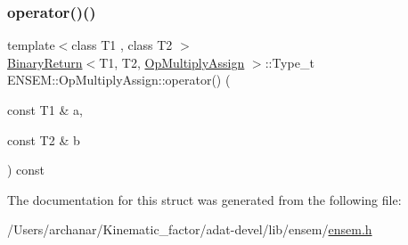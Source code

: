 \subsubsection{\texorpdfstring{operator()()}{operator()()}\hspace{0.1cm}{\footnotesize\ttfamily [3/3]}}
{\footnotesize\ttfamily template$<$class T1 , class T2 $>$ \\
\mbox{\hyperlink{structENSEM_1_1BinaryReturn}{Binary\+Return}}$<$T1, T2, \mbox{\hyperlink{structENSEM_1_1OpMultiplyAssign}{Op\+Multiply\+Assign}} $>$\+::Type\+\_\+t E\+N\+S\+E\+M\+::\+Op\+Multiply\+Assign\+::operator() (\begin{DoxyParamCaption}\item[{const T1 \&}]{a,  }\item[{const T2 \&}]{b }\end{DoxyParamCaption}) const\hspace{0.3cm}{\ttfamily [inline]}}



The documentation for this struct was generated from the following file\+:\begin{DoxyCompactItemize}
\item 
/\+Users/archanar/\+Kinematic\+\_\+factor/adat-\/devel/lib/ensem/\mbox{\hyperlink{adat-devel_2lib_2ensem_2ensem_8h}{ensem.\+h}}\end{DoxyCompactItemize}
